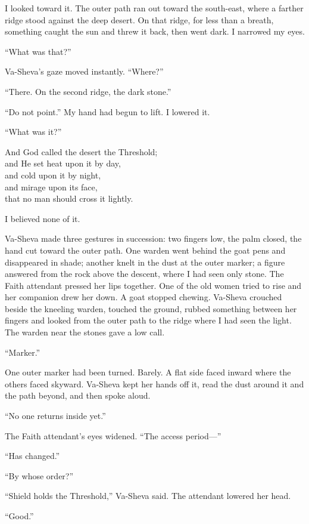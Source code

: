 I looked toward it. The outer path ran out toward the south-east, where a farther ridge stood against the deep desert. On that ridge, for less than a breath, something caught the sun and threw it back, then went dark. I narrowed my eyes.\par

``What was that?''\par
Va-Sheva's gaze moved instantly. ``Where?''\par
``There. On the second ridge, the dark stone.''\par
``Do not point.'' 
My hand had begun to lift. I lowered it. \par
``What was it?''\par

\begin{scripture}
And God called the desert the Threshold; \\
and He set heat upon it by day, \\
and cold upon it by night, \\
and mirage upon its face, \\
that no man should cross it lightly.\par
\end{scripture}

I believed none of it.

\ornament

Va-Sheva made three gestures in succession: two fingers low, the palm closed, the hand cut toward the outer path. One warden went behind the goat pens and disappeared in shade; another knelt in the dust at the outer marker; a figure answered from the rock above the descent, where I had seen only stone. The Faith attendant pressed her lips together. One of the old women tried to rise and her companion drew her down. A goat stopped chewing. Va-Sheva crouched beside the kneeling warden, touched the ground, rubbed something between her fingers and looked from the outer path to the ridge where I had seen the light. The warden near the stones gave a low call.\par

``Marker.''\par

One outer marker had been turned. Barely. A flat side faced inward where the others faced skyward. Va-Sheva kept her hands off it, read the dust around it and the path beyond, and then spoke aloud.\par

``No one returns inside yet.''\par
The Faith attendant's eyes widened. ``The access period---''\par
``Has changed.''\par
``By whose order?''\par
``Shield holds the Threshold,'' Va-Sheva said. The attendant lowered her head.\par
``Good.''\par

